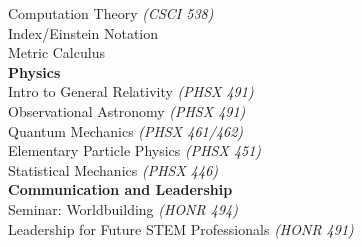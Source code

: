 \documentclass[margin]{res}
\begin{document}
\begin{resume}
{	\hspace{3ex} Computation Theory \textit{(CSCI 538)}\\
	\hspace{3ex} Index/Einstein Notation\\
	\hspace{3ex} Metric Calculus\vspace*{1ex}\\
\textbf{Physics}\\
	\hspace{3ex} Intro to General Relativity \textit{(PHSX 491)}\\
	\hspace{3ex} Observational Astronomy \textit{(PHSX 491)}\\
	\hspace{3ex} Quantum Mechanics \textit{(PHSX 461/462)}\\
	\hspace{3ex} Elementary Particle Physics \textit{(PHSX 451)}\\
	\hspace{3ex} Statistical Mechanics \textit{(PHSX 446)}\vspace*{1ex}\\
\textbf{Communication and Leadership}\\
	\hspace{3ex} Seminar: Worldbuilding \textit{(HONR 494)}\\
	\hspace{3ex} Leadership for Future STEM Professionals \textit{(HONR 491)}\\
}






\end{resume}
\end{document}

